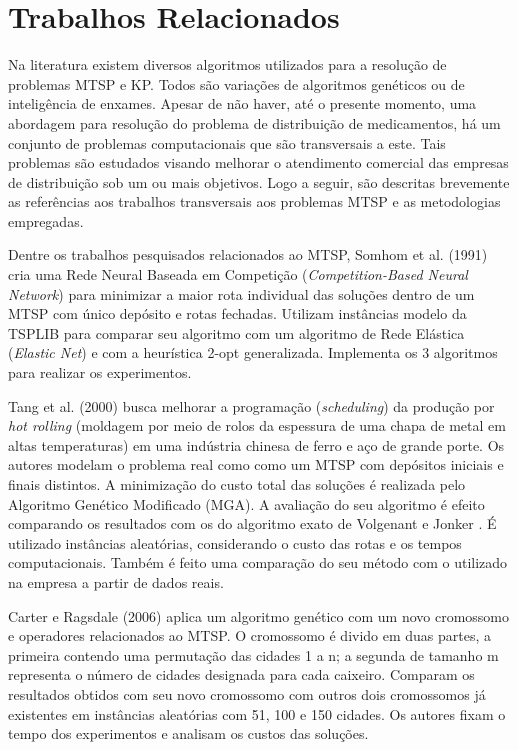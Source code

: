 \chapter{Trabalhos Relacionados}

Na literatura existem diversos algoritmos utilizados para a resolução de problemas MTSP e KP. Todos são variações de algoritmos genéticos ou de inteligência de enxames. Apesar de não haver, até o presente momento, uma abordagem para resolução do problema de distribuição de medicamentos, há um conjunto de problemas computacionais que são transversais a este. Tais problemas são estudados visando melhorar o atendimento comercial das empresas de distribuição sob um ou mais objetivos. Logo a seguir, são descritas brevemente as referências aos trabalhos transversais aos problemas MTSP e as metodologias empregadas.

Dentre os trabalhos pesquisados relacionados ao MTSP, Somhom et al. (1991) \cite{somhom1999competition} cria uma Rede Neural Baseada em Competição (\textit{Competition-Based Neural Network}) para minimizar a maior rota individual das soluções dentro de um MTSP com único depósito e rotas fechadas. Utilizam instâncias modelo da TSPLIB \cite{reinelt1991tsplib} para comparar seu algoritmo com um algoritmo de Rede Elástica (\textit{Elastic Net}) e com a heurística 2-opt generalizada. Implementa os 3 algoritmos para realizar os experimentos.

Tang et al. (2000) \cite{tang2000multiple} busca melhorar a programação (\textit{scheduling}) da produção por \textit{hot rolling} (moldagem por meio de rolos da espessura de uma chapa de metal em altas temperaturas) em uma indústria chinesa de ferro e aço de grande porte. Os autores modelam o problema real como como um MTSP com depósitos iniciais e finais distintos. A minimização do custo total das soluções é realizada pelo Algoritmo Genético Modificado (MGA). A avaliação do seu algoritmo é efeito comparando os resultados com os do algoritmo exato de Volgenant e Jonker \cite{tang2000multiple}. É utilizado instâncias aleatórias, considerando o custo das rotas e os tempos computacionais. Também é feito uma comparação do seu método com o utilizado na empresa a partir de dados reais.

Carter e Ragsdale (2006) \cite{carter2006new} aplica um algoritmo genético com um novo cromossomo e operadores relacionados ao MTSP. O cromossomo é divido em duas partes, a primeira contendo uma permutação das cidades 1 a n; a segunda de tamanho m representa o número de cidades designada para cada caixeiro. Comparam os resultados obtidos com seu novo cromossomo com outros dois cromossomos já existentes em instâncias aleatórias com 51, 100 e 150 cidades. Os autores fixam o tempo dos experimentos e analisam os custos das soluções.


